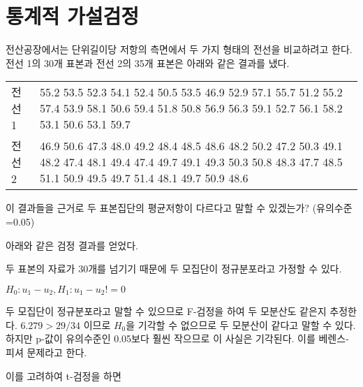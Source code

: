 \section{통계적 가설검정}
전산공장에서는 단위길이당 저항의 측면에서 두 가지 형태의 전선을 비교하려고
한다. 전선 1의 30개 표본과 전선 2의 35개 표본은 아래와 같은 결과를 냈다.

\begin{tabularx}{0.9\textwidth}{ l|X }
  \noalign{\smallskip}\hline\noalign{\smallskip}
  전선 1 & 
    55.2 53.5 52.3 54.1 52.4 50.5 53.5 46.9 52.9 57.1
    55.7 51.2 55.2 57.4 53.9 58.1 50.6 59.4 51.8 50.8
    56.9 56.3 59.1 52.7 56.1 58.2 53.1 50.6 53.1 59.7 \\
  전선 2 &
    46.9 50.6 47.3 48.0 49.2 48.4 48.5 48.6 48.2 50.2
    47.2 50.3 49.1 48.2 47.4 48.1 49.4 47.4 49.7 49.1
    49.3 50.3 50.8 48.3 47.7 48.5 51.1 50.9 49.5 49.7
    51.4 48.1 49.7 50.9 48.6
\end{tabularx}

이 결과들을 근거로 두 표본집단의 평균저항이 다르다고 말할 수 있겠는가?
{\small(유의수준=0.05)}

아래와 같은 검정 결과를 얻었다.


두 표본의 자료가 30개를 넘기기 때문에 두 모집단이 정규분포라고 가정할 수 있다.

$H_0: u_1 - u_2, H_1: u_1 - u_2 != 0$

두 모집단이 정규분포라고 말할 수 있으므로
F-검정을 하여 두 모분산도 같은지 추정한다.
$6.279 > 29/34$ 이므로 $H_0$을 기각할 수 없으므로
두 모분산이 같다고 말할 수 있다.
하지만 p-값이 유의수준인 0.05보다 훨씬 작으므로 이 사실은 기각된다.
이를 베렌스-피셔 문제라고 한다.

이를 고려하여 t-검정을 하면
